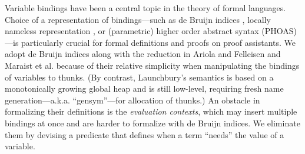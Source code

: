 \documentclass{llncs}
\begin{document}
Variable bindings have been a central topic in the theory of formal languages.  Choice of a representation of bindings---such as de Bruijn indices \cite{deBruijn72}, locally nameless representation \cite{Gordon93,Mckinna99,McBride04}, or (parametric) higher order abstract syntax (PHOAS) \cite{Pfenning88,Chlipala08}---is particularly crucial for formal definitions and proofs on proof assistants.
We adopt de Bruijn indices along with the reduction in Ariola and Felleisen \cite{Ariola97} and Maraist et al. \cite{Maraist98} because of their relative simplicity when manipulating the bindings of variables to thunks.  (By contrast, Launchbury's semantics is based on a monotonically growing global heap and is still low-level, requiring fresh name generation---a.k.a. ``gensym''---for allocation of thunks.)
An obstacle in formalizing their definitions is the \emph{evaluation contexts}, which may insert multiple bindings at once and are harder to formalize with de Bruijn indices.  We eliminate them by devising a predicate that defines when a term ``needs'' the value of a variable.
\end{document}
